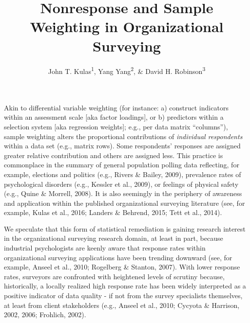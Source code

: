 \documentclass[
  man,mask]{apa7}
\title{Nonresponse and Sample Weighting in Organizational Surveying}
\author{John T. Kulas\textsuperscript{1}, Yang Yang\textsuperscript{2}, \& David H. Robinson\textsuperscript{3}}
\date{}
\affiliation{\vspace{0.5cm}\textsuperscript{1} Montclair State University\\\textsuperscript{2} China Select\\\textsuperscript{3} St.~Cloud State University}
\begin{document}
\maketitle

Akin to differential variable weighting (for instance: a) construct indicators within an assessment scale {[}aka factor loadings{]}, or b) predictors within a selection system {[}aka regression weights{]}; e.g., per data matrix ``columns''), sample weighting alters the proportional contributions of \emph{individual respondents} within a data set (e.g., matrix rows). Some respondents' responses are assigned greater relative contribution and others are assigned less. This practice is commonplace in the summary of general population polling data reflecting, for example, elections and politics (e.g., Rivers \& Bailey, 2009), prevalence rates of psychological disorders (e.g., Kessler et al., 2009), or feelings of physical safety (e.g., Quine \& Morrell, 2008). It is also seemingly in the periphery of awareness and application within the published organizational surveying literature (see, for example, Kulas et al., 2016; Landers \& Behrend, 2015; Tett et al., 2014).

We speculate that this form of statistical remediation is gaining research interest in the organizational surveying research domain, at least in part, because industrial psychologists are keenly aware that response rates within organizational surveying applications have been trending downward (see, for example, Anseel et al., 2010; Rogelberg \& Stanton, 2007). With lower response rates, surveyors are confronted with heightened levels of scrutiny because, historically, a locally realized high response rate has been widely interpreted as a positive indicator of data quality - if not from the survey specialists themselves, at least from client stakeholders (e.g., Anseel et al., 2010; Cycyota \& Harrison, 2002, 2006; Frohlich, 2002).
\end{document}
